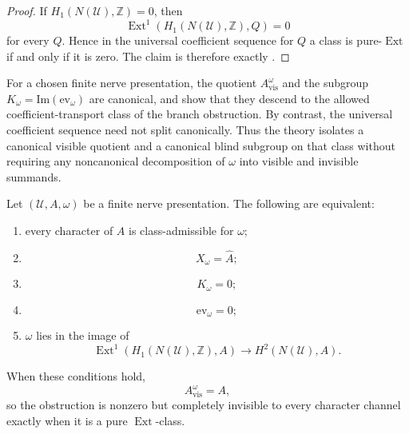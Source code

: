\begin{proof}
If $H_1(N(\mathcal U),\mathbb Z)=0$, then
\[
\operatorname{Ext}^1(H_1(N(\mathcal U),\mathbb Z),Q)=0
\]
for every $Q$. Hence in the universal coefficient sequence for $Q$ a class is
pure-$\operatorname{Ext}$ if and only if it is zero. The claim is therefore
exactly .
\end{proof}

\begin{remark}\label{rem:no-canonical-splitting}
For a chosen finite nerve presentation, the quotient
$A_{\mathrm{vis}}^{\omega}$ and the subgroup
$K_{\omega}=\mathrm{Im}(\mathrm{ev}_{\omega})$ are canonical, and
show that they descend to the allowed coefficient-transport class of the branch
obstruction. By contrast, the universal coefficient sequence need not split
canonically. Thus the theory isolates a canonical visible quotient and a
canonical blind subgroup on that class without requiring any noncanonical
decomposition of $\omega$ into visible and invisible summands.
\end{remark}

\begin{theorem}\label{thm:character-blind-obstructions}
Let $(\mathcal U,A,\omega)$ be a finite nerve presentation. The following are
equivalent:
\begin{enumerate}[label=(\roman*),nosep]
\item every character of $A$ is class-admissible for $\omega$;
\item
\[
X_{\omega}=\widehat A;
\]
\item
\[
K_{\omega}=0;
\]
\item
\[
\mathrm{ev}_{\omega}=0;
\]
\item $\omega$ lies in the image of
\[
\operatorname{Ext}^1(H_1(N(\mathcal U),\mathbb Z),A)\longrightarrow
H^2(N(\mathcal U),A).
\]
\end{enumerate}
When these conditions hold,
\[
A_{\mathrm{vis}}^{\omega}=A,
\]
so the obstruction is nonzero but completely invisible to every character
channel exactly when it is a pure $\operatorname{Ext}$-class.
\end{theorem}

